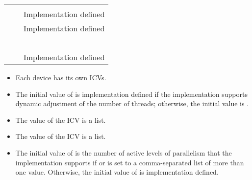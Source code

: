 \begin{supertabular}{p{1.4in} p{1.8in} p{1.5in}}
{}  & {}  & {}         \\
{}   & {}   & Implementation defined \\
{}    & {}    & Implementation defined \\
{}    & {}    & {}      \\
{} & {} & {}          \\
{}              & {}              & {}       \\
{}    & {}    & {}  \\
{}             & {}             & {}      \\
{}     & {}         & Implementation defined \\
\end{supertabular}

\linenumbers

\descr

\begin{itemize}
\item Each device has its own ICVs.

\item The initial value of  is implementation defined if the 
      implementation supports dynamic adjustment of the number of threads; 
      otherwise, the initial value is .

\item The value of the  ICV is a list.

\item The value of the  ICV is a list.

\item The initial value of  is the number of 
      active levels of parallelism that the implementation supports if
       or  is set to a comma-separated
      list of more than one value. Otherwise, the initial value of
       is implementation defined.
\end{itemize}

